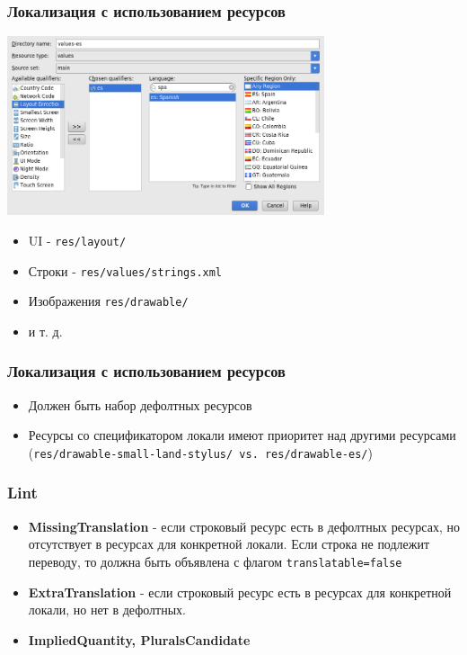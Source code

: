 \documentclass{beamer}
\begin{document}
\begin{frame}
    \frametitle{Локализация с использованием ресурсов}
    \begin{center}
        \includegraphics[width=0.7\textwidth,keepaspectratio]{images/resources}
    \end{center}
    \begin{itemize}
        \item UI - \texttt{res/layout/}
        \item Строки - \texttt{res/values/strings.xml}
        \item Изображения \texttt{res/drawable/}
        \item и т. д.
    \end{itemize}
\end{frame}

\begin{frame}
    \frametitle{Локализация с использованием ресурсов}
    \begin{itemize}
        \item Должен быть набор дефолтных ресурсов
        \item Ресурсы со спецификатором локали имеют приоритет над другими ресурсами
            (\texttt{res/drawable-small-land-stylus/ vs. res/drawable-es/})
    \end{itemize}
\end{frame}

\begin{frame}
    \frametitle{Lint}
    \begin{itemize}
        \item \textbf{MissingTranslation} - если строковый ресурс есть в
            дефолтных ресурсах, но отсутствует в ресурсах для конкретной
            локали. Если строка не подлежит переводу, то
            должна быть объявлена с флагом \texttt{translatable=false}
        \item \textbf{ExtraTranslation} - если строковый ресурс есть в ресурсах
			для конкретной локали, но нет в дефолтных.
        \item \textbf{ImpliedQuantity, PluralsCandidate}
    \end{itemize}
\end{frame}
\end{document}
